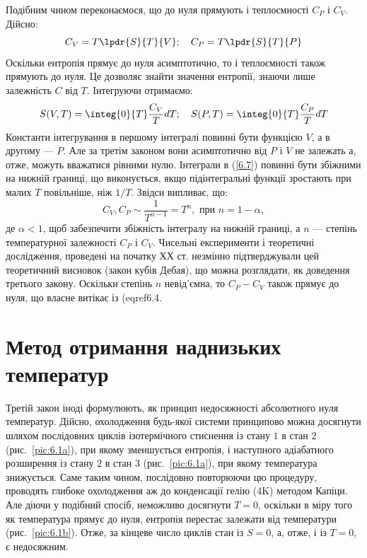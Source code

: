 Подібним чином переконаємося, що до нуля прямують і теплоємності $C_P$ і $C_V$. Дійсно:
\begin{equation}\label{6.6}
	C_V=T\lpdr{S}{T}{V}; \quad C_P = T \lpdr{S}{T}{P}
\end{equation}
Оскільки ентропія прямує до нуля асимптотично, то і теплоємності також прямують до нуля. Це дозволяє знайти значення ентропії, знаючи лише залежність $C$ від $T$. Інтегруючи отримаємо:
\begin{equation}\label{6.7}
	S(V,T) = \integ{0}{T}\dfrac{C_V}{T}dT; \quad S(P,T)= \integ{0}{T}\dfrac{C_P}{T}dT
\end{equation}
Константи інтегрування в першому інтегралі повинні бути функцією $V$, а в другому --- $P$. Але за третім законом вони асимптотично від $P$ і $V$ не залежать а, отже, можуть вважатися рівними нулю. Інтеграли в (\ref{6.7}) повинні бути збіжними на нижній границі, що виконується, якщо підінтегральні функції зростають при малих $T$ повільніше, ніж $1/T$. Звідси випливає, що:
\begin{equation}\label{6.8}
	C_V,C_P\sim\dfrac{1}{T^{\alpha-1}}=T^{n}, \text{ при } n = 1-\alpha,
\end{equation}
де $\alpha<1$, щоб забезпечити збіжність інтегралу на нижній границі, а $n$ --- степінь температурної залежності $C_P$ і $C_V$. Чисельні експерименти і теоретичні дослідження, проведені на початку ХХ ст. незмінно підтверджували цей теоретичний висновок (закон кубів Дебая), що можна розглядати, як доведення третього закону. Оскільки степінь $n$ невід'ємна, то $C_P-C_V$ також прямує до нуля, що власне витікає із (eqref{6.4}.


\section{Метод отримання наднизьких температур}


Третій закон іноді формулюють, як принцип недосяжності абсолютного нуля температур. Дійсно, охолодження будь-якої системи принципово можна досягнути шляхом послідовних циклів ізотермічного стиснення із стану $1$ в стан $2$ (рис.~\ref{pic:6.1a}), при якому зменшується ентропія, і наступного адіабатного розширення із стану $2$ в стан $3$ (рис.~\ref{pic:6.1a}), при якому температура знижується. Саме таким чином, послідовно повторюючи цю процедуру, проводять глибоке охолодження аж до конденсації гелію (4\degree K) методом Капіци. Але діючи у подібний спосіб, неможливо досягнути $T=0$, оскільки в міру того як температура прямує до нуля, ентропія перестає залежати від температури (рис.~\ref{pic:6.1b}). Отже, за кінцеве число циклів стан із $S=0$, а, отже, і із $T=0$, є недосяжним.

